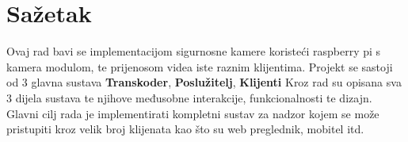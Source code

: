 \section{Sažetak}
Ovaj rad bavi se implementacijom sigurnosne kamere koristeći raspberry pi s kamera modulom, 
te prijenosom videa iste raznim klijentima.
\paraBreak
Projekt se sastoji od 3 glavna sustava \textbf{Transkoder}, \textbf{Poslužitelj}, \textbf{Klijenti}
\paraBreak
Kroz rad su opisana sva 3 dijela sustava te njihove međusobne interakcije, funkcionalnosti te dizajn.
\paraBreak
Glavni cilj rada je implementirati kompletni sustav za nadzor kojem se može pristupiti kroz velik broj klijenata kao 
što su web preglednik, mobitel itd.
